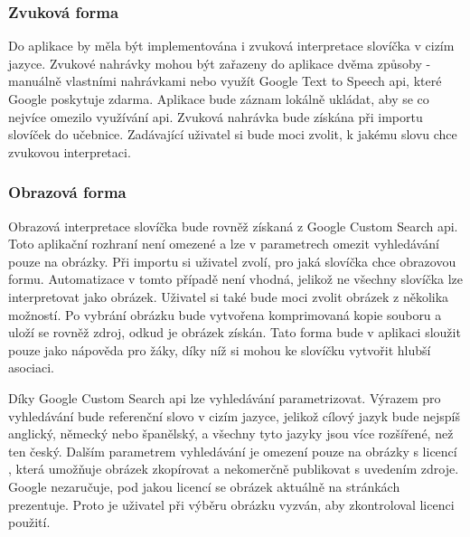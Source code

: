 \documentclass[a4paper,11pt,titlepage,fleqn]{article}
\begin{document}
        \subsubsection{Zvuková forma}
            Do aplikace by měla být implementována i zvuková interpretace slovíčka v cizím jazyce. Zvukové nahrávky mohou být zařazeny do aplikace dvěma způsoby - manuálně vlastními nahrávkami nebo využít Google Text to Speech \gls{api}, které Google poskytuje zdarma. Aplikace bude záznam lokálně ukládat, aby se co nejvíce omezilo využívání \gls{api}. Zvuková nahrávka bude získána při importu slovíček do učebnice. Zadávající uživatel si bude moci zvolit, k jakému slovu chce zvukovou interpretaci.

        \subsubsection{Obrazová forma}
            Obrazová interpretace slovíčka bude rovněž získaná z Google Custom Search \gls{api}. Toto aplikační rozhraní není omezené a lze v parametrech omezit vyhledávání pouze na obrázky. Při importu si uživatel zvolí, pro jaká slovíčka chce obrazovou formu. Automatizace v tomto případě není vhodná, jelikož ne všechny slovíčka lze interpretovat jako obrázek. Uživatel si také bude moci zvolit obrázek z několika možností. Po vybrání obrázku bude vytvořena komprimovaná kopie souboru a uloží se rovněž zdroj, odkud je obrázek získán. Tato forma bude v aplikaci sloužit pouze jako nápověda pro žáky, díky níž si mohou ke slovíčku vytvořit hlubší asociaci. 

            Díky Google Custom Search \gls{api} lze vyhledávání parametrizovat. Výrazem pro vyhledávání bude referenční slovo v cizím jazyce, jelikož cílový jazyk bude nejspíš anglický, německý nebo španělský, a všechny tyto jazyky jsou více rozšířené, než ten český. Dalším parametrem vyhledávání je omezení pouze na obrázky s licencí , která umožňuje obrázek zkopírovat a nekomerčně publikovat s uvedením zdroje. Google nezaručuje, pod jakou licencí se obrázek aktuálně na stránkách prezentuje. Proto je uživatel při výběru obrázku vyzván, aby zkontroloval licenci použití.
\end{document}
